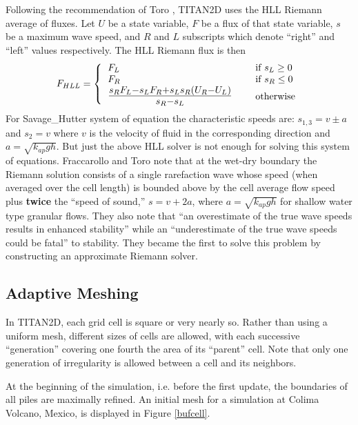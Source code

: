 \documentclass[letterpaper,10pt]{article}
\begin{document}
Following the recommendation of Toro \cite{ToroBook2001}, TITAN2D uses 
the HLL Riemann average of fluxes. Let $U$ be a state variable, $F$ 
be a flux of that state variable, $s$ be a maximum wave speed, 
and $R$ and $L$ subscripts which denote ``right'' and ``left'' values 
respectively.  The HLL Riemann flux is then
\begin{equation}
F_{HLL}=\left\{\begin{tabular}{lll}$F_L$&\hspace{0.5 truein}& if $s_L\ge 0$\\$F_R$&& if $s_R\le 0$\\{\Large 
$\frac{s_RF_L-s_LF_R+s_Ls_R(U_R-U_L)}{s_R-s_L}$}&& otherwise\end{tabular} \right.
\end{equation}
For Savage\_Hutter system of equation the characteristic speeds are: $s_{1,3}=v\pm a$ and $s_2=v$ where $v$ is the 
velocity of fluid in the corresponding direction and $a=\sqrt{k_{ap}gh}$.
But just the above HLL solver is not enough for solving this system of equations.
Fraccarollo and Toro \cite{FraccarolloToro1995} note that at the 
wet-dry boundary the Riemann solution consists of a single rarefaction 
wave whose speed (when averaged over the cell length) 
is bounded above by the cell average flow speed plus 
{\bf twice} the ``speed of sound,'' $s=v+2a$, where $a=\sqrt{k_{ap}gh}$ 
for shallow water type granular flows.  They also note that ``an overestimate 
of the true wave speeds results in enhanced stability'' while an 
``underestimate of the true wave speeds could be fatal'' to stability.
They became the first to 
solve this problem by constructing an approximate Riemann solver.\newline

\subsection{Adaptive Meshing} \label{adaptivemeshing}
In   TITAN2D, each grid cell is square or very nearly so.  Rather than 
using a uniform mesh, different sizes of cells are allowed, with each 
successive ``generation'' covering one fourth the area of its ``parent'' 
cell.  Note that only one generation of irregularity is allowed between 
a cell and its neighbors.\newline

At the beginning of the simulation, i.e. before the first update, the 
boundaries of all piles are maximally refined. An initial mesh for a 
simulation at Colima Volcano, Mexico, is displayed in Figure \ref{bufcell}. 
\end{document}
